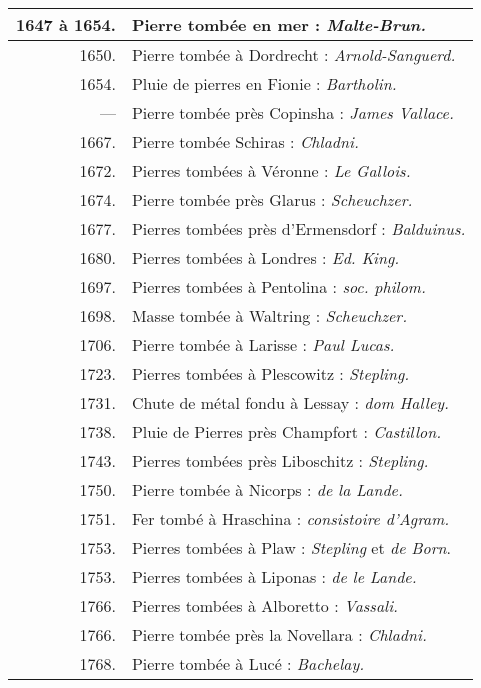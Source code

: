 \documentclass[a4paper, 12pt, oneside, french]{article}
\begin{document}
\begin{center}
\begin{longtable}{r p{85mm}}
        1647 à 1654. & Pierre tombée en mer : \emph{Malte-Brun.}   \\ \hline
        1650. & Pierre tombée à Dordrecht : \emph{Arnold-Sanguerd.}   \\ \hline
        1654. & Pluie de pierres en Fionie : \emph{Bartholin.}   \\ \hline
        --- & Pierre tombée près Copinsha : \emph{James Vallace.}   \\ \hline
        1667. & Pierre tombée Schiras : \emph{Chladni.}   \\ \hline
        1672. & Pierres tombées à Véronne : \emph{Le Gallois.}   \\ \hline
        1674. & Pierre tombée près Glarus : \emph{Scheuchzer.}   \\ \hline
        1677. & Pierres tombées près d'Ermensdorf : \emph{Balduinus.}   \\ \hline
        1680. & Pierres tombées à Londres : \emph{Ed. King.}   \\ \hline
        1697. & Pierres tombées à Pentolina : \emph{soc. philom.}   \\ \hline
        1698. & Masse tombée à Waltring : \emph{Scheuchzer.}   \\ \hline
        1706. & Pierre tombée à Larisse : \emph{Paul Lucas.}   \\ \hline
        1723. & Pierres tombées à Plescowitz : \emph{Stepling.}   \\ \hline
        1731. & Chute de métal fondu à Lessay : \emph{dom Halley.}   \\ \hline
        1738. & Pluie de Pierres près Champfort : \emph{Castillon.}   \\ \hline
        1743. & Pierres tombées près Liboschitz : \emph{Stepling.}   \\ \hline
        1750. & Pierre tombée à Nicorps : \emph{de la Lande.}     \\ \hline
        1751. & Fer tombé à Hraschina : \emph{consistoire d'Agram.}   \\ \hline
        1753. & Pierres tombées à Plaw : \emph{Stepling} et \emph{de Born}.   \\ \hline
        1753. & Pierres tombées à Liponas : \emph{de le Lande.}   \\ \hline
        1766. & Pierres tombées à Alboretto : \emph{Vassali.}   \\ \hline
        1766. & Pierre tombée près la Novellara : \emph{Chladni.}   \\ \hline
        1768. & Pierre tombée à Lucé : \emph{Bachelay.}   \\ \hline

\end{longtable}
\end{center}
\end{document}

